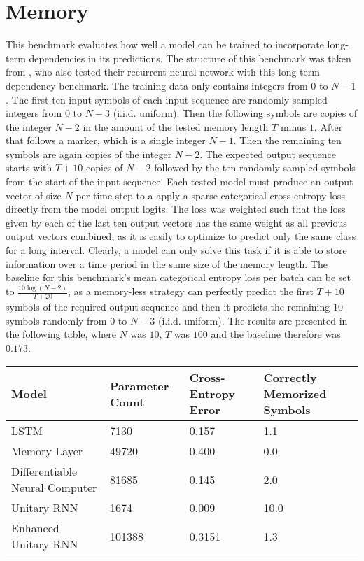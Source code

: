 \documentclass[draft,final]{vutinfth} %
\begin{document}
    \section{Memory}
    This benchmark evaluates how well a model can be trained to incorporate long-term dependencies in its predictions.
    The structure of this benchmark was taken from \cite{UnitaryRNNs}, who also tested their recurrent neural network with this long-term dependency benchmark.
    The training data only contains integers from $0$ to $N-1$. The first ten input symbols of each input sequence are randomly sampled integers from $0$ to $N-3$ (i.i.d. uniform).
    Then the following symbols are copies of the integer $N-2$ in the amount of the tested memory length $T$ minus $1$.
    After that follows a marker, which is a single integer $N-1$.
    Then the remaining ten symbols are again copies of the integer $N-2$.
    The expected output sequence starts with $T+10$ copies of $N-2$ followed by the ten randomly sampled symbols from the start of the input sequence.
    Each tested model must produce an output vector of size $N$ per time-step to a apply a sparse categorical cross-entropy loss directly from the model output logits.
    The loss was weighted such that the loss given by each of the last ten output vectors has the same weight as all previous output vectors combined, as it is easily to optimize to predict only the same class for a long interval.
    Clearly, a model can only solve this task if it is able to store information over a time period in the same size of the memory length.
    The baseline for this benchmark's mean categorical entropy loss per batch can be set to $\frac{10\log(N-2)}{T+20}$, as a memory-less strategy can perfectly predict the first $T+10$ symbols of the required output sequence and then it predicts the remaining $10$ symbols randomly from $0$ to $N-3$ (i.i.d. uniform).
    The results are presented in the following table, where $N$ was $10$, $T$ was $100$ and the baseline therefore was $0.173$:
    \begin{table}[h]
        \begin{tabular}{llll}
            \hline
            Model                          & Parameter Count & Cross-Entropy Error & Correctly Memorized Symbols \\ \hline
            LSTM                           & 7130            & 0.157               & 1.1                         \\
            Memory Layer                   & 49720           & 0.400               & 0.0                         \\
            Differentiable Neural Computer & 81685           & 0.145               & 2.0                         \\
            Unitary RNN                    & 1674            & 0.009               & 10.0                        \\
            Enhanced Unitary RNN           & 101388          & 0.3151              & 1.3                         \\
        \end{tabular}
    \end{table}
\end{document}
